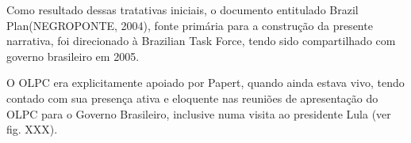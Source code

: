 \documentclass[
12pt,		%
openright,	%
twoside,  %
a4paper,			%
chapter=TITLE,		%
english,			%
french,				%
spanish,			%
brazil				%
]{USPSC-classe/USPSC}
\begin{document}
Como resultado dessas tratativas iniciais, o documento entitulado \textquotedbl Brazil Plan\textquotedbl   (NEGROPONTE, 2004), fonte prim\'aria para a constru\c{c}\~ao da presente narrativa, foi direcionado \`a \textquotedbl Brazilian Task Force\textquotedbl , tendo sido compartilhado com governo brasileiro em 2005.









O OLPC era explicitamente apoiado por Papert, quando ainda estava vivo, tendo contado com sua presen\c{c}a ativa e eloquente nas reuni\~oes de apresenta\c{c}\~ao do OLPC para o Governo Brasileiro, inclusive numa visita ao presidente Lula (ver fig. XXX).
\end{document}

